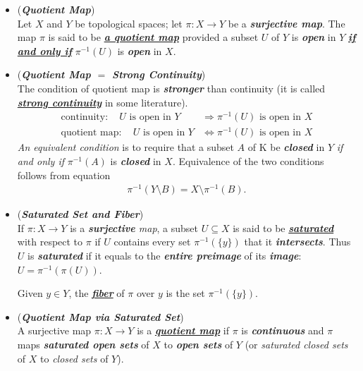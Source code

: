 \documentclass[11pt]{article}
\begin{document}
\begin{itemize}
\item \begin{definition} (\emph{\textbf{Quotient Map}})\\
Let $X$ and $Y$ be topological spaces; let $\pi : X \rightarrow Y$ be a \emph{\textbf{surjective map}}. The map $\pi$ is said to be \underline{\emph{\textbf{a quotient map}}} provided a subset $U$ of $Y$ is \emph{\textbf{open}} in $Y$ \underline{\emph{\textbf{if and only if}}} $\pi^{-1}(U)$ is \emph{\textbf{open}} in $X$.
\end{definition}

\item \begin{remark}(\emph{\textbf{Quotient Map $=$ Strong Continuity}})\\
The condition of quotient map is \emph{\textbf{stronger}} than continuity (it is called \underline{\emph{\textbf{strong continuity}}} in some literature). 
\begin{align*}
\text{continuity}: \quad U \text{ is open in }Y & \Rightarrow \pi^{-1}(U) \text{ is open in }X\\
\text{quotient map}: \quad U \text{ is open in }Y & \Leftrightarrow \pi^{-1}(U) \text{ is open in }X
\end{align*}
\emph{An equivalent condition} is to require that a subset $A$ of K be \emph{\textbf{closed}} in $Y$ \emph{if and only if} $\pi^{-1}(A)$ is \emph{\textbf{closed}} in $X$. Equivalence of the two conditions follows from equation
\begin{align*}
\pi^{-1}(Y \setminus B) = X \setminus \pi^{-1}(B).
\end{align*}
\end{remark}

\item \begin{definition} (\emph{\textbf{Saturated Set and Fiber}})\\
If $\pi: X \rightarrow Y$ is a \emph{\textbf{surjective} map}, a subset $U \subseteq X$ is said to be \underline{\emph{\textbf{saturated}}} with respect to $\pi$ if $U$ contains every set $\pi^{-1}(\{y\})$ that it \emph{\textbf{intersects}}. Thus $U$ is \emph{\textbf{saturated}} if it equals to the \textbf{\emph{entire preimage}} of its \emph{\textbf{image}}: $U =\pi^{-1}(\pi(U))$. 

Given $y \in Y$, the \underline{\emph{\textbf{fiber}}} of $\pi$ over $y$ is the set $\pi^{-1}(\{y\})$. 
\end{definition}

\item \begin{definition} (\emph{\textbf{Quotient Map via Saturated Set}})\\
A surjective map $\pi : X \rightarrow Y$ is a \underline{\emph{\textbf{quotient map}}} if $\pi$ is \emph{\textbf{continuous}} and $\pi$ maps \emph{\textbf{saturated open sets}} of $X$ to \emph{\textbf{open sets}} of $Y$ (or \emph{saturated closed sets} of $X$ to \emph{closed sets} of $Y$).
\end{definition}



\end{itemize}
\end{document}
